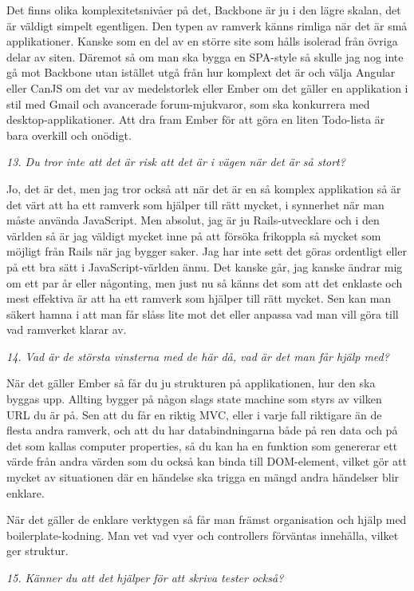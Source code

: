 \documentclass[11pt]{article}
\begin{document}
Det finns olika komplexitetsnivåer på det, Backbone är ju i den lägre skalan, det är väldigt simpelt egentligen. Den typen av ramverk känns rimliga när det är små applikationer. Kanske som en del av en större site som hålls isolerad från övriga delar av siten. Däremot så om man ska bygga en SPA-style så skulle jag nog inte gå mot Backbone utan istället utgå från hur komplext det är och välja Angular eller CanJS om det var av medelstorlek eller Ember om det gäller en applikation i stil med Gmail och avancerade forum-mjukvaror, som ska konkurrera med desktop-applikationer. Att dra fram Ember för att göra en liten Todo-lista är bara overkill och onödigt.

\emph{13. Du tror inte att det är risk att det är i vägen när det är så stort?}

Jo, det är det, men jag tror också att när det är en så komplex applikation så är det värt att ha ett ramverk som hjälper till rätt mycket, i synnerhet när man måste använda JavaScript. Men absolut, jag är ju Rails-utvecklare och i den världen så är jag väldigt mycket inne på att försöka frikoppla så mycket som möjligt från Rails när jag bygger saker. Jag har inte sett det göras ordentligt eller på ett bra sätt i JavaScript-världen ännu. Det kanske går, jag kanske ändrar mig om ett par år eller någonting, men just nu så känns det som att det enklaste och mest effektiva är att ha ett ramverk som hjälper till rätt mycket. Sen kan man säkert hamna i att man får slåss lite mot det eller anpassa vad man vill göra till vad ramverket klarar av.

\emph{14. Vad är de största vinsterna med de här då, vad är det man får hjälp med?}

När det gäller Ember så får du ju strukturen på applikationen, hur den ska byggas upp. Allting bygger på någon slags state machine som styrs av vilken URL du är på. Sen att du får en riktig MVC, eller i varje fall riktigare än de flesta andra ramverk, och att du har databindningarna både på ren data och på det som kallas computer properties, så du kan ha en funktion som genererar ett värde från andra värden som du också kan binda till DOM-element, vilket gör att mycket av situationen där en händelse ska trigga en mängd andra händelser blir enklare.

När det gäller de enklare verktygen så får man främst organisation och hjälp med boilerplate-kodning. Man vet vad vyer och controllers förväntas innehålla, vilket ger struktur.

\emph{15. Känner du att det hjälper för att skriva tester också?}
\end{document}
